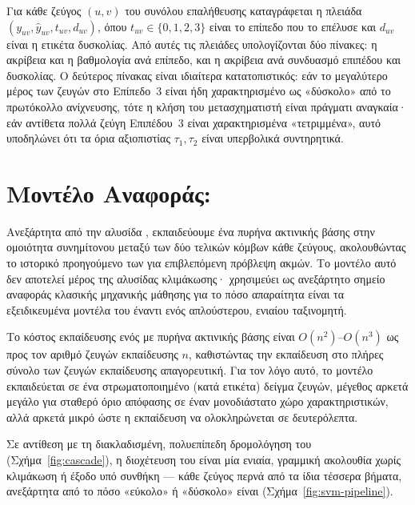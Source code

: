Για κάθε ζεύγος $(u,v)$ του συνόλου επαλήθευσης καταγράφεται η πλειάδα
$(y_{uv}, \hat{y}_{uv}, t_{uv}, d_{uv})$, όπου $t_{uv} \in \{0,1,2,3\}$ είναι το
επίπεδο που το επέλυσε και $d_{uv}$ είναι η ετικέτα δυσκολίας.
Από αυτές τις
πλειάδες υπολογίζονται δύο πίνακες: η ακρίβεια και η βαθμολογία  ανά
επίπεδο, και η ακρίβεια ανά συνδυασμό επιπέδου και δυσκολίας.
Ο δεύτερος πίνακας
είναι ιδιαίτερα κατατοπιστικός: εάν το μεγαλύτερο μέρος των ζευγών στο Επίπεδο~3
είναι ήδη χαρακτηρισμένο ως «δύσκολο» από το πρωτόκολλο ανίχνευσης, τότε η κλήση
του μετασχηματιστή είναι πράγματι αναγκαία· εάν αντίθετα πολλά ζεύγη Επιπέδου~3
είναι χαρακτηρισμένα «τετριμμένα», αυτό υποδηλώνει ότι τα όρια αξιοπιστίας
$\tau_1, \tau_2$ είναι υπερβολικά συντηρητικά.


\section{Μοντέλο Αναφοράς: }
\label{sec:svm-baseline}

Ανεξάρτητα από την αλυσίδα , εκπαιδεύουμε ένα  πυρήνα
ακτινικής βάσης στην ομοιότητα συνημίτονου  μεταξύ των δύο τελικών
κόμβων κάθε ζεύγους, ακολουθώντας το ιστορικό προηγούμενο των
\textcite{alhasan2006link} για επιβλεπόμενη πρόβλεψη ακμών.
Το μοντέλο αυτό δεν
αποτελεί μέρος της αλυσίδας κλιμάκωσης· χρησιμεύει ως ανεξάρτητο σημείο αναφοράς
κλασικής μηχανικής μάθησης για το πόσο απαραίτητα είναι τα εξειδικευμένα μοντέλα
του  έναντι ενός απλούστερου, ενιαίου ταξινομητή.

Το κόστος εκπαίδευσης ενός  με πυρήνα ακτινικής βάσης είναι
$O(n^2)$--$O(n^3)$ ως προς τον αριθμό ζευγών εκπαίδευσης $n$, καθιστώντας την
εκπαίδευση στο πλήρες σύνολο των \TrainPairs{} ζευγών εκπαίδευσης απαγορευτική.
Για
τον λόγο αυτό, το μοντέλο εκπαιδεύεται σε ένα στρωματοποιημένο (κατά ετικέτα)
δείγμα \SvmSampleSize{} ζευγών, μέγεθος αρκετά μεγάλο για σταθερό όριο απόφασης σε έναν
μονοδιάστατο χώρο χαρακτηριστικών, αλλά αρκετά μικρό ώστε η εκπαίδευση να
ολοκληρώνεται σε δευτερόλεπτα.

Σε αντίθεση με τη διακλαδισμένη, πολυεπίπεδη δρομολόγηση του 
(Σχήμα~\ref{fig:cascade}), η διοχέτευση του  είναι μία ενιαία, γραμμική
ακολουθία χωρίς κλιμάκωση ή έξοδο υπό συνθήκη --- κάθε ζεύγος περνά από τα ίδια
τέσσερα βήματα, ανεξάρτητα από το πόσο «εύκολο» ή «δύσκολο» είναι
(Σχήμα~\ref{fig:svm-pipeline}).


